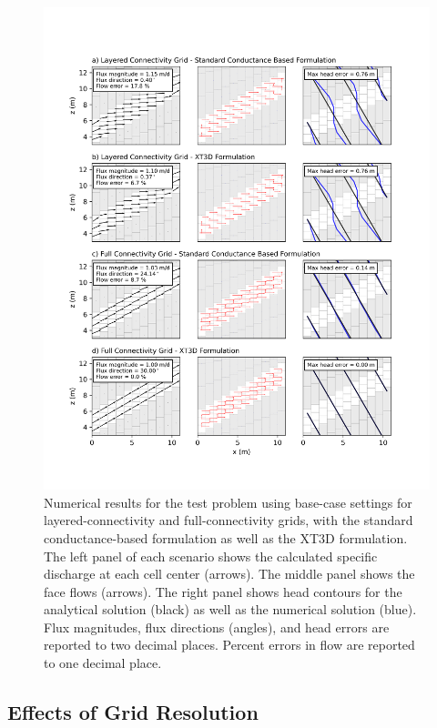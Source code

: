 \documentclass{article}
\begin{document}
\begin{figure}[p!]
	\begin{center}
	\includegraphics[scale=0.75]{../figures/fig2_paper.png}
	\caption{Numerical results for the test problem using base-case settings for layered-connectivity and full-connectivity grids, with the standard conductance-based formulation as well as the XT3D formulation. The left panel of each scenario shows the calculated specific discharge at each cell center (arrows). The middle panel shows the face flows (arrows). The right panel shows head contours for the analytical solution (black) as well as the numerical solution (blue). Flux magnitudes, flux directions (angles), and head errors are reported to two decimal places. Percent errors in flow are reported to one decimal place.}
	\label{fig:fig2}
	\end{center}
\end{figure}

\subsection*{Effects of Grid Resolution}
\end{document}
